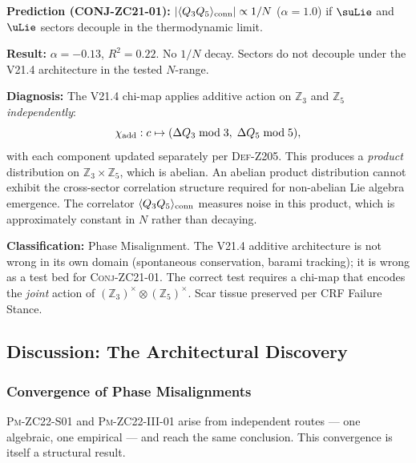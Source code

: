 \documentclass[12pt, a4paper]{article}
\begin{document}
\begin{formalbox}[title={PM-ZC22-III-01: V21.4 Additive Chi-Map is an
  Architectural Limitation}]
\textbf{Prediction (CONJ-ZC21-01):}
$|\langle Q_3 Q_5\rangle_{\rm conn}| \propto 1/N$
($\alpha = 1.0$) if $\suLie$ and $\uLie$ sectors
decouple in the thermodynamic limit.

\textbf{Result:} $\alpha = -0.13$, $R^2 = 0.22$.
No $1/N$ decay. Sectors do not decouple under
the V21.4 architecture in the tested $N$-range.

\textbf{Diagnosis:} The V21.4 chi-map applies additive action
on $\mathbb{Z}_3$ and $\mathbb{Z}_5$ \emph{independently}:
\begin{equation*}
  \chi_{\rm add}: c \mapsto
  (\Delta Q_3 \bmod 3,\; \Delta Q_5 \bmod 5),
\end{equation*}
with each component updated separately per \textsc{Def-Z205}.
This produces a \emph{product} distribution on
$\mathbb{Z}_3 \times \mathbb{Z}_5$, which is abelian.
An abelian product distribution cannot exhibit the
cross-sector correlation structure required for
non-abelian Lie algebra emergence.
The correlator $\langle Q_3 Q_5\rangle_{\rm conn}$
measures noise in this product, which is approximately
constant in $N$ rather than decaying.

\textbf{Classification:} Phase Misalignment.
The V21.4 additive architecture is not wrong in its own domain
(spontaneous conservation, barami tracking); it is wrong
as a test bed for \textsc{Conj-ZC21-01}.
The correct test requires a chi-map that encodes
the \emph{joint} action of $(\mathbb{Z}_3)^\times \otimes (\mathbb{Z}_5)^\times$.
Scar tissue preserved per CRF Failure Stance.
\end{formalbox}

\subsection{Discussion: The Architectural Discovery}
\label{zc22:sec:discussion}

\subsubsection{Convergence of Phase Misalignments}

\textsc{Pm-ZC22-S01} and \textsc{Pm-ZC22-III-01}
arise from independent routes --- one algebraic, one empirical ---
and reach the same conclusion.
This convergence is itself a structural result.
\end{document}
